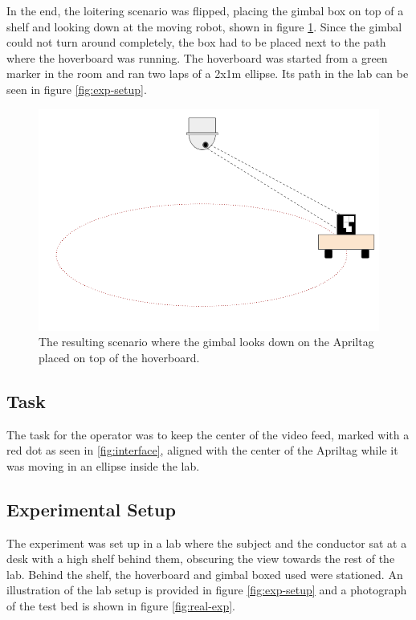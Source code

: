 \documentclass[nofilelist]{cslthse-msc}
\begin{document}
In the end, the loitering scenario was flipped, placing the gimbal box on top of a shelf and looking down at the moving robot, shown in figure \ref{fig:testbed-idea-2}. Since the gimbal could not turn around completely, the box had to be placed next to the path where the hoverboard was running. The hoverboard was started from a green marker in the room and ran two laps of a 2x1m ellipse. Its path in the lab can be seen in figure \ref{fig:exp-setup}.

\begin{figure}[htp]
   \centering
   \includegraphics[width=.6\textwidth]{images/testbed2.png}
   \caption{The resulting scenario where the gimbal looks down on the Apriltag placed on top of the hoverboard.}
   \label{fig:testbed-idea-2}
\end{figure}

\subsection{Task}
The task for the operator was to keep the center of the video feed, marked with a red dot as seen in \ref{fig:interface}, aligned with the center of the Apriltag while it was moving in an ellipse inside the lab.

\subsection{Experimental Setup}
The experiment was set up in a lab where the subject and the conductor sat at a desk with a high shelf behind them, obscuring the view towards the rest of the lab. Behind the shelf, the hoverboard and gimbal boxed used were stationed. An illustration of the lab setup is provided in figure \ref{fig:exp-setup} and a photograph of the test bed is shown in figure \ref{fig:real-exp}.
\end{document}
